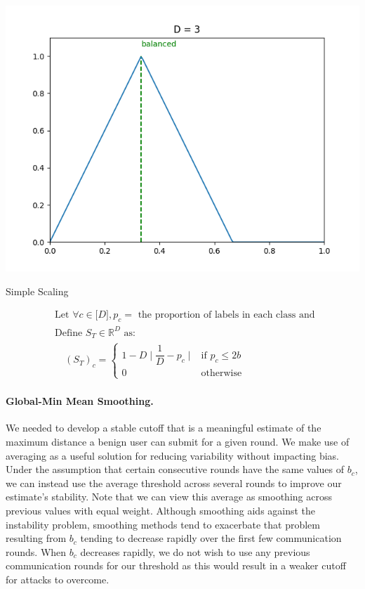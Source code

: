 \documentclass{article} %
\begin{document}
\begin{minipage}{.4\linewidth}
    \centering
    \includegraphics[width=\textwidth]{99_article/99_visuals/extra_plots/scaling.png}
    \caption{Simple Scaling}
    \label{fig:my_label}
\end{minipage}%
\begin{minipage}{.6\textwidth}
    \begin{align}
        & \textrm{Let } \forall c \in \mathopen[ D \mathclose], p_c = \textrm{ the proportion of labels in each class and } \nonumber \\
        & \textrm{Define } S_T \in \mathbb{R}^D \textrm{ as:} \nonumber \\
        & \quad (S_T)_c = \begin{cases}
           1 - D \mid \dfrac{1}{D} - p_c \mid    & \text{if } p_c \leq 2b \\
           0    & \text{otherwise}
      \end{cases}
    \end{align}
\end{minipage}

%
\paragraph{Global-Min Mean Smoothing. } We needed to develop a stable cutoff that is a meaningful estimate of the maximum distance a benign user can submit for a given round. We make use of averaging as a useful solution for reducing variability without impacting bias. Under the assumption that certain consecutive rounds have the same values of $b_c$, we can instead use the average threshold across several rounds to improve our estimate's stability. Note that we can view this average as smoothing across previous values with equal weight. Although smoothing aids against the instability problem, smoothing methods tend to exacerbate that problem resulting from $b_c$ tending to decrease rapidly over the first few communication rounds. When $b_c$ decreases rapidly, we do not wish to use any previous communication rounds for our threshold as this would result in a weaker cutoff for attacks to overcome. 
\end{document}
